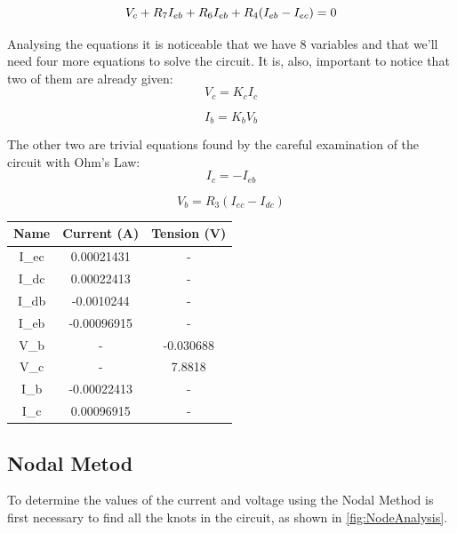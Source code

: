 \begin{equation}
     V_{c} + R_{7} I_{eb} + R_{6} I_{eb} + R_{4} (I_{eb} - I_{ec}) = 0
      \label{eq:KVL_{eb}}
\end{equation}

\vspace{0.5cm}
Analysing the equations it is noticeable that we have 8 variables and that we'll need four more equations to solve the circuit. It is, also, important to notice that two of them are already given:
\begin{equation}
    V_{c} = K_{c} I_{c}
\end{equation}

\begin{equation}
    I_{b} = K_{b} V_{b}
\end{equation}

\vspace{0.5cm}
The other two are trivial equations found by the careful examination of the circuit with Ohm's Law:
\vspace{0.5cm}
\begin{equation}
    I_{c} = -I_{eb}
\end{equation}

\begin{equation}
    V_{b} = R_{3} (I_{ec} - I_{dc})
\end{equation}


\begin{center}
\begin{tabular}{ |c|c|c| }
 \hline
\textbf{Name} & \textbf{Current (A)} & \textbf{Tension (V)} \\
 \hline
 I_{ec} & 0.00021431 & - \\
 \hline
 I_{dc} &  0.00022413 & - \\
 \hline
 I_{db} & -0.0010244 & -  \\
 \hline
 I_{eb} & -0.00096915 & - \\
 \hline
 V_{b} & - & -0.030688 \\
 \hline
 V_{c} & - & 7.8818 \\
 \hline
 I_{b} & -0.00022413 & - \\
 \hline
 I_{c} & 0.00096915 & - \\
 \hline
\end{tabular}
\end{center}

\subsection{Nodal Metod}
To determine the values of the current and voltage using the Nodal Method is first necessary to find all the knots in the circuit, as shown in \ref{fig:NodeAnalysis}.

